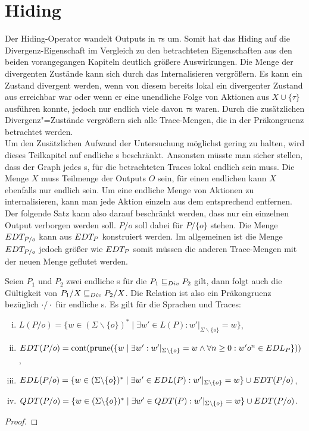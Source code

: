 \section{Hiding}

Der Hiding-Operator wandelt Outputs in $\tau$s um. Somit hat das Hiding auf die
Divergenz-Eigenschaft im Vergleich zu den betrachteten Eigenschaften aus den
beiden vorangegangen Kapiteln deutlich größere Auswirkungen. Die Menge der
divergenten Zustände kann sich durch das Internalisieren vergrößern. Es kann
ein Zustand divergent werden, wenn von diesem bereits lokal ein divergenter
Zustand aus erreichbar war oder wenn er eine unendliche Folge von Aktionen aus
$X\cup \{\tau\}$ ausführen konnte, jedoch nur endlich viele davon $\tau$s
waren. Durch die zusätzlichen Divergenz"=Zustände vergrößern sich alle
Trace-Mengen, die in der Präkongruenz \DRel{} betrachtet werden.\\
Um den Zusätzlichen Aufwand der Untersuchung möglichst gering zu halten, wird
dieses Teilkapitel auf endliche \MEIO{}s beschränkt. Ansonsten müsste man
sicher stellen, dass der Graph jedes \MEIO{}s, für die betrachteten Traces
lokal endlich sein muss. Die Menge $X$ muss Teilmenge der Outputs $O$ sein, für
einen endlichen \MEIO{} kann $X$ ebenfalls nur endlich sein. Um eine endliche
Menge von Aktionen zu internalisieren, kann man jede Aktion einzeln aus dem
entsprechend \MEIO{} entfernen. Der folgende Satz kann also darauf beschränkt
werden, dass nur ein einzelnen Output verborgen werden soll. $P/o$ soll dabei
für $P/\{o\}$ stehen. Die Menge $EDT _{P/o}$ kann aus $EDT _P$ konstruiert
werden. Im allgemeinen ist die Menge $EDT _{P/o}$ jedoch größer wie $EDT _P$
somit müssen die anderen Trace-Mengen mit der neuen Menge geflutet werden.


\begin{Satz}
  \label{DivHidingSatz}
  Seien $P_1$ und $P_2$ zwei endliche \MEIO{}s für die $P_1 \sqsubseteq  _{Div} P_2$ gilt,
  dann folgt auch die Gültigkeit von $P_1/X \sqsubseteq  _{Div} P_2/X$. Die Relation \DRel{}
  ist also ein Präkongruenz bezüglich $\cdot /\cdot$ für endliche \MEIO{}s. Es
  gilt für die Sprachen und Traces:
  \begin{enumerate}[(i)]
    \item $L(P/o) = \{w\in (\Sigma\backslash \{o\})^*\mid \exists w'\in L(P):
      w'|_{\Sigma\backslash \{o\}} = w\}$,
    \item $EDT (P/o) = \mathrm{cont} (\mathrm{prune} (\{w\mid \exists w':w'|_{\Sigma\backslash
      \{o\}} = w\land \forall n\geq 0: w'o^n\in EDL _P\}))$,
    \item $EDL (P/o) = \{w\in (\Sigma\backslash \{o\})^*\mid \exists w'\in
      EDL(P): w'|_{\Sigma\backslash \{o\}} = w\} \cup EDT (P/o)$,
    \item $QDT (P/o) = \{w\in (\Sigma\backslash \{o\})^*\mid \exists w'\in
      QDT(P): w'|_{\Sigma\backslash \{o\}} = w\} \cup EDT (P/o)$.
  \end{enumerate}
\end{Satz}
\begin{proof}
\end{proof}
